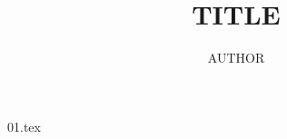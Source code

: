 \documentclass[a4paper,14pt]{extarticle}
\theoremstyle{definition}
\theoremstyle{remark}
\numberwithin{equation}{section} %
\numberwithin{figure}{section} %
\numberwithin{table}{section} %
\begin{document}
    \title{TITLE}
    \author{AUTHOR}
    \date{}
    \maketitle
    \newpage

    \tableofcontents
    \newpage

    {01.tex}
\end{document}
